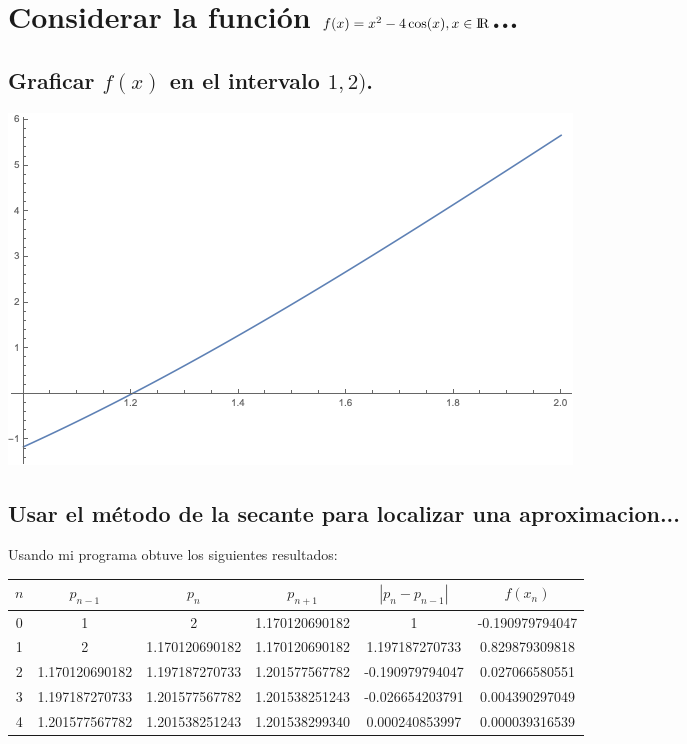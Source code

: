 \documentclass{article}
\begin{document}
\section{Considerar la función $f(x) = x^2-4\cos(x) , x \in {\rm I\!R}$...}
\subsection{Graficar $f(x)$ en el intervalo $1,2)$.}
\includegraphics[scale=0.75]{grafica.png}

\subsection{Usar el método de la secante para localizar una aproximacion...}
Usando mi programa obtuve los siguientes resultados:

\begin{center}
    \begin{tabular}{||c c c c c c||} 
    \hline
    $n$ & $p_{n-1}$ & $p_{n}$  & $p_{n+1}$ & $|p_n - p_{n-1}|$ & $f(x_n)$\\ [0.5ex] 
    \hline\hline
    0 & 1 & 2 & 1.170120690182 & 1 & -0.190979794047 \\ 
    \hline
    1 & 2 & 1.170120690182 & 1.170120690182 & 1.197187270733 & 0.829879309818 \\
    \hline
    2 & 1.170120690182 & 1.197187270733 & 1.201577567782  & -0.190979794047 & 0.027066580551\\
    \hline
    3 & 1.197187270733 & 1.201577567782 & 1.201538251243 & -0.026654203791 & 0.004390297049\\
    \hline
    4 & 1.201577567782 & 1.201538251243 & 1.201538299340  & 0.000240853997 & 0.000039316539\\ [1ex]
    \hline

   \end{tabular}
\end{center}
\end{document}
